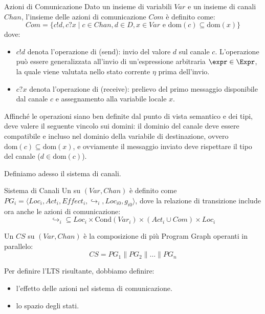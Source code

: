 \begin{definition}{Azioni di Comunicazione}
  Dato un insieme di variabili \(Var\) e un insieme di canali \(Chan\), l'insieme delle azioni di comunicazione \(Com\) è definito come:
  \[Com = \{c!d, c?x \mid c \in Chan, d \in D, x \in Var \text{ e } \text{dom}(c) \subseteq \text{dom}(x)\}\]
  dove:
  \begin{itemize}
    \item \(c!d\) denota l'operazione di  (send): invio del valore \(d\) sul canale \(c\). L'operazione può essere generalizzata all'invio di un'espressione arbitraria \(\expr \in \Expr\), la quale viene valutata nello stato corrente \(\eta\) prima dell'invio.
    \item \(c?x\) denota l'operazione di  (receive): prelievo del primo messaggio disponibile dal canale \(c\) e assegnamento alla variabile locale \(x\).
  \end{itemize}
\end{definition}

\begin{note}{}
  Affinché le operazioni siano ben definite dal punto di vista semantico e dei tipi, deve valere il seguente vincolo sui domini: il dominio del canale deve essere compatibile e incluso nel dominio della variabile di destinazione, ovvero \(\text{dom}(c) \subseteq \text{dom}(x)\), e ovviamente il messaggio inviato deve rispettare il tipo del canale (\(d \in \text{dom}(c)\)).
\end{note}

Definiamo adesso il sistema di canali.

\begin{definition}{Sistema di Canali}
  Un  su \((Var, Chan)\) è definito come \(PG_i = \langle Loc_i, Act_i, Effect_i, \hookrightarrow_i, Loc_{i0}, g_{i0} \rangle\), dove la relazione di transizione include ora anche le azioni di comunicazione:
  \[\hookrightarrow_i \subseteq Loc_i \times \text{Cond}(Var_i) \times (Act_i \cup Com) \times Loc_i\]

  Un  \(CS\) su \((Var, Chan)\) è la composizione di più Program Graph operanti in parallelo:
  \[CS = PG_1 \parallel PG_2 \parallel \dots \parallel PG_n\]
\end{definition}


Per definire l'LTS risultante, dobbiamo definire:

\begin{itemize}
  \item l'effetto delle azioni nel sistema di comunicazione.
  \item lo spazio degli stati.
\end{itemize}

